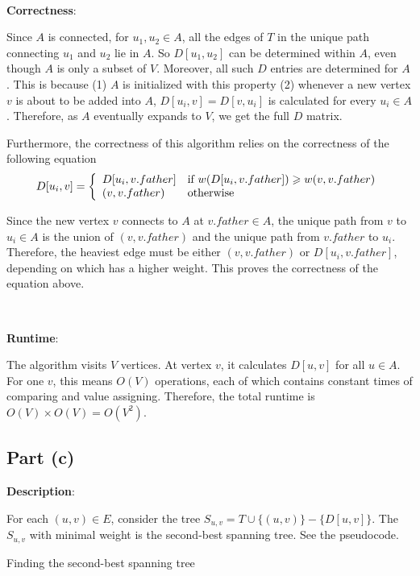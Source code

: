 \documentclass{article}
\begin{document}
~

\noindent\textbf{Correctness}:

Since $A$ is connected, for $u_1,u_2\in A$, all the edges of $T$ in the unique path connecting $u_1$ and $u_2$ lie in $A$. So $D[u_1,u_2]$ can be determined within $A$, even though $A$ is only a subset of $V$. Moreover, all such $D$ entries are determined for $A$. This is because (1) $A$ is initialized with this property (2) whenever a new vertex $v$ is about to be added into $A$, $D[u_i,v]=D[v,u_i]$ is calculated for every $u_i\in A$. Therefore, as $A$ eventually expands to $V$, we get the full $D$ matrix.

Furthermore, the correctness of this algorithm relies on the correctness of the following equation
\begin{equation*}
D[u_i,v]=\left\{\begin{array}{ll}D[u_i,v.father]&\textup{if }w(D[u_i,v.father])\geqslant w(v,v.father)\\(v,v.father)&\textup{otherwise}\end{array}\right.
\end{equation*}

Since the new vertex $v$ connects to $A$ at $v.father\in A$, the unique path from $v$ to $u_i\in A$ is the union of $(v,v.father)$ and the unique path from $v.father$ to $u_i$. Therefore, the heaviest edge must be either $(v,v.father)$ or $D[u_i,v.father]$, depending on which has a higher weight. This proves the correctness of the equation above.

~

\noindent\textbf{Runtime}:

The algorithm visits $V$ vertices. At vertex $v$, it calculates $D[u,v]$ for all $u\in A$. For one $v$, this means $O(V)$ operations, each of which contains constant times of comparing and value assigning. Therefore, the total runtime is $O(V)\times O(V)=O(V^2)$.

\subsection{Part (c)}
\noindent\textbf{Description}:

For each $(u,v)\in E$, consider the tree $S_{u,v}=T\cup\{(u,v)\}-\{D[u,v]\}$. The $S_{u,v}$ with minimal weight is the second-best spanning tree. See the pseudocode.
\begin{algorithm}
\caption{Finding the second-best spanning tree}
\begin{algorithmic}[1]
	\EndIf
\EndFor
{}
\EndProcedure
\end{algorithmic}
\end{algorithm}
\end{document}
